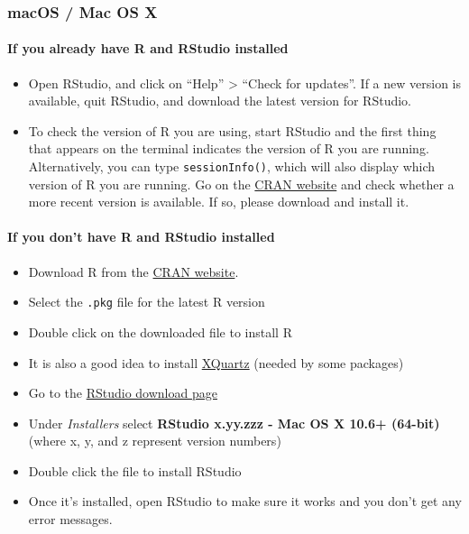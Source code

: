 \documentclass[
  12pt, krantz2,
]{krantz}
\newcommand{\passthrough}[1]{#1}
\providecommand{\tightlist}{%
  \setlength{\itemsep}{0pt}\setlength{\parskip}{0pt}}
\newcommand{\1}{\mathbbm{1}}
\theoremstyle{definition}
\theoremstyle{definition}
\theoremstyle{definition}
\theoremstyle{definition}
\theoremstyle{remark}
\begin{document}
\hypertarget{macos-mac-os-x}{%
\subsubsection{macOS / Mac OS X}\label{macos-mac-os-x}}

\hypertarget{if-you-already-have-r-and-rstudio-installed-1}{%
\paragraph{If you already have R and RStudio installed}\label{if-you-already-have-r-and-rstudio-installed-1}}

\begin{itemize}
\tightlist
\item
  Open RStudio, and click on ``Help'' \textgreater{} ``Check for updates''. If a new version is
  available, quit RStudio, and download the latest version for RStudio.
\item
  To check the version of R you are using, start RStudio and the first thing
  that appears on the terminal indicates the version of R you are running.
  Alternatively, you can type \passthrough{\lstinline!sessionInfo()!}, which will also display which
  version of R you are running. Go on the \href{https://cran.r-project.org/bin/macosx/}{CRAN
  website} and check whether a more
  recent version is available. If so, please download and install it.
\end{itemize}

\hypertarget{if-you-dont-have-r-and-rstudio-installed-1}{%
\paragraph{If you don't have R and RStudio installed}\label{if-you-dont-have-r-and-rstudio-installed-1}}

\begin{itemize}
\tightlist
\item
  Download R from
  the \href{http://cran.r-project.org/bin/macosx}{CRAN website}.
\item
  Select the \passthrough{\lstinline!.pkg!} file for the latest R version
\item
  Double click on the downloaded file to install R
\item
  It is also a good idea to install \href{https://www.xquartz.org/}{XQuartz} (needed
  by some packages)
\item
  Go to the \href{https://www.rstudio.com/products/rstudio/download/\#download}{RStudio download
  page}
\item
  Under \emph{Installers} select \textbf{RStudio x.yy.zzz - Mac OS X 10.6+ (64-bit)}
  (where x, y, and z represent version numbers)
\item
  Double click the file to install RStudio
\item
  Once it's installed, open RStudio to make sure it works and you don't get any
  error messages.
\end{itemize}
\end{document}
